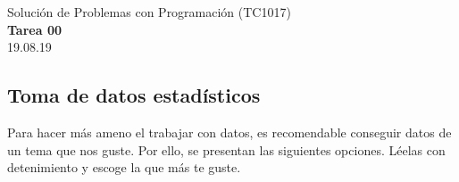 \documentclass[]{book}
\theoremstyle{definition}
\begin{document}
\begin{center}
{\huge Solución de Problemas con Programación (TC1017)}\\[1.5ex]
{\large \textbf{Tarea 00}\\[1.5ex] %
19.08.19} %
\end{center}

\vspace{0.2 cm}

\subsection*{Toma de datos estadísticos}

Para hacer más ameno el trabajar con datos, es recomendable conseguir datos de un tema que nos guste.
Por ello, se presentan las siguientes opciones. Léelas con detenimiento y escoge la que más te guste.
\end{document}
